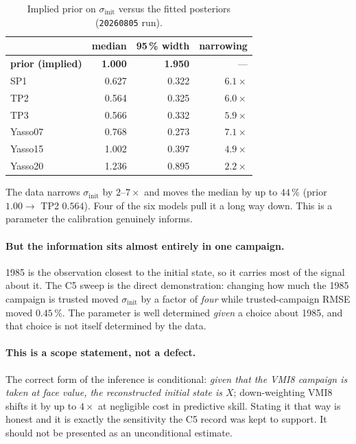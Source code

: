 \documentclass[11pt]{article}
\newcommand{\sinit}{\sigma_{\mathrm{init}}}
\begin{document}
\begin{table}[H]\centering\small
\caption{Implied prior on $\sinit$ versus the fitted posteriors (\texttt{20260805} run).}
\begin{tabular}{lrrr}
\toprule
 & median & 95\,\% width & narrowing\\
\midrule
\textbf{prior (implied)} & \textbf{1.000} & \textbf{1.950} & ---\\
SP1     & 0.627 & 0.322 & $6.1\times$\\
TP2     & 0.564 & 0.325 & $6.0\times$\\
TP3     & 0.566 & 0.332 & $5.9\times$\\
Yasso07 & 0.768 & 0.273 & $7.1\times$\\
Yasso15 & 1.002 & 0.397 & $4.9\times$\\
Yasso20 & 1.236 & 0.895 & $2.2\times$\\
\bottomrule
\end{tabular}
\end{table}

\noindent The data narrows $\sinit$ by $2$--$7\times$ and moves the median by up to $44\,\%$
(prior $1.00 \rightarrow$ TP2 $0.564$). Four of the six models pull it a long way down. This is a
parameter the calibration genuinely informs.

\paragraph{But the information sits almost entirely in one campaign.} 1985 is the observation
closest to the initial state, so it carries most of the signal about it. The C5 sweep is the
direct demonstration: changing how much the 1985 campaign is trusted moved $\sinit$ by a factor
of \emph{four} while trusted-campaign RMSE moved $0.45\,\%$. The parameter is well determined
\emph{given} a choice about 1985, and that choice is not itself determined by the data.

\paragraph{This is a scope statement, not a defect.} The correct form of the inference is
conditional: \emph{given that the VMI8 campaign is taken at face value, the reconstructed initial
state is $X$}; down-weighting VMI8 shifts it by up to $4\times$ at negligible cost in predictive
skill. Stating it that way is honest and it is exactly the sensitivity the C5 record was kept to
support. It should not be presented as an unconditional estimate.
\end{document}
